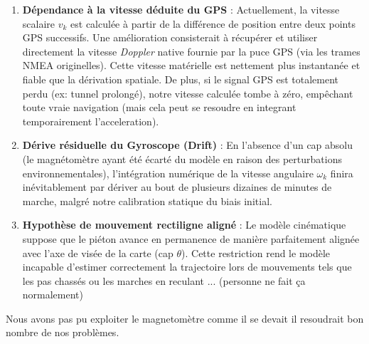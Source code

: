 \begin{enumerate}
    \item \textbf{Dépendance à la vitesse déduite du GPS} : Actuellement, la vitesse scalaire $v_k$ est calculée à partir de la différence de position entre deux points GPS successifs. Une amélioration  consisterait à récupérer et utiliser directement la vitesse \textit{Doppler} native fournie par la puce GPS (via les trames NMEA originelles). Cette vitesse matérielle est nettement plus instantanée et fiable que la dérivation spatiale. De plus, si le signal GPS est totalement perdu (ex: tunnel prolongé), notre vitesse calculée tombe à zéro, empêchant toute vraie navigation (mais cela peut se resoudre en integrant temporairement l'acceleration).
    \item \textbf{Dérive résiduelle du Gyroscope (Drift)} : En l'absence d'un cap absolu (le magnétomètre ayant été écarté du modèle en raison des perturbations environnementales), l'intégration numérique de la vitesse angulaire $\omega_k$ finira inévitablement par dériver au bout de plusieurs dizaines de minutes de marche, malgré notre calibration statique du biais initial.
    \item \textbf{Hypothèse de mouvement rectiligne aligné} : Le modèle cinématique suppose que le piéton avance en permanence de manière parfaitement alignée avec l'axe de visée de la carte (cap $\theta$). Cette restriction rend le modèle incapable d'estimer correctement la trajectoire lors de mouvements tels que les pas chassés ou les marches en reculant ... (personne ne fait ça normalement)
\end{enumerate}

Nous avons pas pu exploiter le magnetomètre comme il se devait il resoudrait bon nombre de nos problèmes.